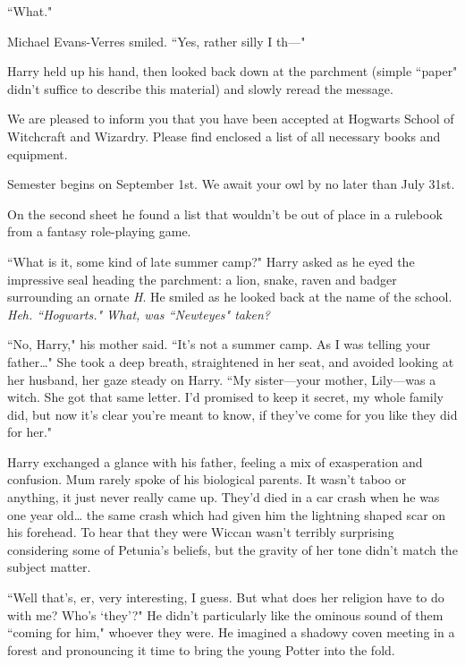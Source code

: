 ``What."

Michael Evans-Verres smiled. ``Yes, rather silly I th---"

Harry held up his hand, then looked back down at the parchment (simple ``paper" didn't suffice to describe this material) and slowly reread the message.

\begin{writtenNote}

We are pleased to inform you that you have been accepted at Hogwarts School of Witchcraft and Wizardry. Please find enclosed a list of all necessary books and equipment.

Semester begins on September 1st. We await your owl by no later than July 31st.


\end{writtenNote}

On the second sheet he found a list that wouldn't be out of place in a rulebook from a fantasy role-playing game.

``What is it, some kind of late summer camp?" Harry asked as he eyed the impressive seal heading the parchment: a lion, snake, raven and badger surrounding an ornate \emph{H}. He smiled as he looked back at the name of the school. \emph{Heh. ``Hogwarts." What, was ``Newteyes" taken?}

``No, Harry," his mother said. ``It's not a summer camp. As I was telling your father{\ldots}" She took a deep breath, straightened in her seat, and avoided looking at her husband, her gaze steady on Harry. ``My sister---your mother, Lily---was a witch. She got that same letter. I'd promised to keep it secret, my whole family did, but now it's clear you're meant to know, if they've come for you like they did for her."

Harry exchanged a glance with his father, feeling a mix of exasperation and confusion. Mum rarely spoke of his biological parents. It wasn't taboo or anything, it just never really came up. They'd died in a car crash when he was one year old{\ldots} the same crash which had given him the lightning shaped scar on his forehead. To hear that they were Wiccan wasn't terribly surprising considering some of Petunia's beliefs, but the gravity of her tone didn't match the subject matter.

``Well that's, er, very interesting, I guess. But what does her religion have to do with me? Who's `they'?" He didn't particularly like the ominous sound of them ``coming for him," whoever they were. He imagined a shadowy coven meeting in a forest and pronouncing it time to bring the young Potter into the fold.

